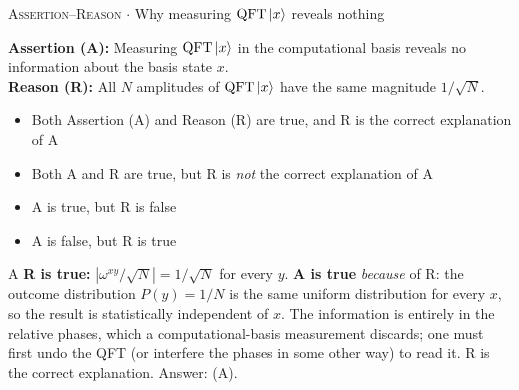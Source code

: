 \documentclass[11pt,a4paper]{article}
\newcommand{\optlabel}[1]{\textbf{(#1)}}
\newcommand{\correctlabel}[1]{\textcolor{okgreen}{\textbf{(#1)}\,\ding{51}}}
\newenvironment{qitem}[1]{\begin{list}{}{\setlength{\leftmargin}{3.3em}\setlength{\labelwidth}{3.1em}%
  \setlength{\labelsep}{0.2em}\setlength{\topsep}{3pt}\setlength{\parsep}{3pt}}\item[\textbf{Q.#1}\hfill]}{\end{list}}
\newcommand{\qsep}{\par\vspace{2pt}{\color{black!15}\hrule}\vspace{4pt}}
\newcommand{\qmeta}[2]{{\footnotesize\color{black!60}\textsc{#1} \;$\cdot$\; #2}\par}
\begin{document}
\begin{qitem}{57}
\qmeta{Assertion--Reason}{Why measuring $\mathrm{QFT}\ket{x}$ reveals nothing}
\textbf{Assertion (A):} Measuring $\mathrm{QFT}\ket{x}$ in the computational basis reveals no information about the
basis state $x$.\\[1mm]
\textbf{Reason (R):} All $N$ amplitudes of $\mathrm{QFT}\ket{x}$ have the same magnitude $1/\sqrt N$.
\begin{itemize}[leftmargin=2.6em, labelsep=0.4em, itemsep=2pt, topsep=3pt]
\item[\correctlabel{A}] Both Assertion (A) and Reason (R) are true, and R is the correct explanation of A
\item[\optlabel{B}] Both A and R are true, but R is \emph{not} the correct explanation of A
\item[\optlabel{C}] A is true, but R is false
\item[\optlabel{D}] A is false, but R is true
\end{itemize}
\end{qitem}
\begin{solbox}{A}
\textbf{R is true:} $|\omega^{xy}/\sqrt N| = 1/\sqrt N$ for every $y$. \textbf{A is true} \emph{because} of R: the outcome
distribution $P(y) = 1/N$ is the same uniform distribution for every $x$, so the result is statistically independent of $x$.
The information is entirely in the relative phases, which a computational-basis measurement discards; one must first
undo the QFT (or interfere the phases in some other way) to read it. R is the correct explanation. Answer: (A).
\end{solbox}
\qsep
\end{document}

